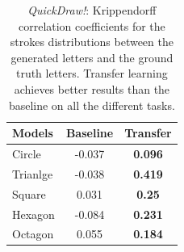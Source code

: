        \begin{table}[!htbp]
          \centering
          \begin{tabular}{l c c} \hline
          Models & Baseline & Transfer\\ \hline
          Circle &  -0.037 &  \textbf{0.096} \\ %
          Trianlge & -0.038 & \textbf{0.419} \\ %
          Square &  0.031 &  \textbf{0.25} \\ %
          Hexagon & -0.084 & \textbf{0.231} \\ %
          Octagon & 0.055 & \textbf{0.184} \\ \hline

          \end{tabular}
          \caption{\textit{QuickDraw!}: Krippendorff correlation coefficients for the strokes distributions between the generated letters and the ground truth letters. Transfer learning achieves better results than the baseline on all the different tasks.}
          \label{table:quickdraw_strokes_transfer}
        \end{table}

